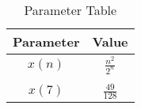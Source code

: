 \documentclass{article}
\begin{document}
\begin{table}[h]
    \centering
    \caption{Parameter Table}
    \begin{tabular}{|c|c|}
        \hline
        \textbf{Parameter} & \textbf{Value} \\
        \hline
        \(x(n)\) & \(\frac{n^2}{2^n}\) \\ \\
        \(x(7)\) & \(\frac{49}{128}\) \\
        \hline
    \end{tabular} 
\end{table}
\end{document}
